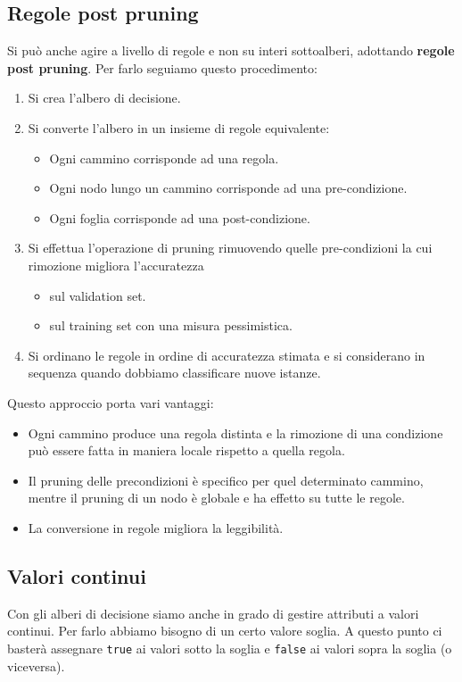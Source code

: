 \subsection{Regole post pruning}
Si pu\`o anche agire a livello di regole e non su interi sottoalberi, adottando \textbf{regole post pruning}. Per farlo
seguiamo questo procedimento:
\begin{enumerate}
	\item Si crea l'albero di decisione.
	\item Si converte l'albero in un insieme di regole equivalente:
	      \begin{itemize}
		      \item Ogni cammino corrisponde ad una regola.
		      \item Ogni nodo lungo un cammino corrisponde ad una pre-condizione.
		      \item Ogni foglia corrisponde ad una post-condizione.
	      \end{itemize}
	\item Si effettua l'operazione di pruning rimuovendo quelle pre-condizioni la cui rimozione migliora l'accuratezza
	      \begin{itemize}
		      \item sul validation set.
		      \item sul training set con una misura pessimistica.
	      \end{itemize}
	\item Si ordinano le regole in ordine di accuratezza stimata e si considerano in sequenza quando dobbiamo
	      classificare nuove istanze.
\end{enumerate}
Questo approccio porta vari vantaggi:
\begin{itemize}
	\item Ogni cammino produce una regola distinta e la rimozione di una condizione pu\`o essere fatta in maniera
	      locale rispetto a quella regola.
	\item Il pruning delle precondizioni \`e specifico per quel determinato cammino, mentre il pruning di un nodo
	      \`e globale e ha effetto su tutte le regole.
	\item La conversione in regole migliora la leggibilit\`a.
\end{itemize}

\subsection{Valori continui}
Con gli alberi di decisione siamo anche in grado di gestire attributi a valori continui. Per farlo abbiamo bisogno di
un certo valore soglia. A questo punto ci baster\`a assegnare \verb|true| ai valori sotto la soglia e \verb|false| ai
valori sopra la soglia (o viceversa).

